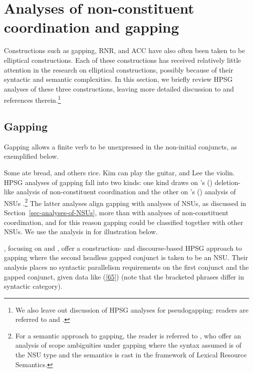 \section{Analyses of non-constituent coordination and gapping}
\label{sec-analyses-of-noncon}

Constructions such as gapping, RNR, and ACC have also often been taken to be elliptical
constructions. Each of these constructions has received relatively little attention in the research
on elliptical constructions, possibly because of their syntactic and semantic complexities. In this
section, we briefly review HPSG analyses of these three constructions, leaving more detailed
discussion to  and references therein.\footnote{We also leave out
  discussion of HPSG analyses for pseudogapping: readers are referred to \citet{Miller92d-u,
    Kim2020} and .}


\subsection{Gapping}
\label{ellipsis:sec-gapping}

Gapping %
allows a finite
verb to be unexpressed in the non-initial conjuncts, as exemplified below. %

\eal
\label{ex-gapping}
\ex Some ate bread, and others rice.\label{g1}
\ex Kim can play the guitar, and Lee the violin.\label{g2}
\zl
%
%
%
%
HPSG analyses of gapping fall into two kinds: one kind draws on \citeauthor{Beavers2004}'s (\citeyear{Beavers2004}) deletion-like analysis of non-constituent coordination \citep{Chaves2009} and the other on \citeauthor{Ginzburg:Sag:2000}'s (\citeyear{Ginzburg:Sag:2000}) analysis of NSUs \citep{Abeille2014}.\footnote{For a semantic approach to gapping, the reader is referred to \citet{Parketal2019}, who offer an analysis of scope ambiguities under gapping where the syntax assumed is of the NSU  type and the semantics is cast in the framework of Lexical Resource Semantics.} The latter analyses align gapping with analyses of NSUs, as discussed in Section~\ref{sec-analyses-of-NSUs}, more than with analyses of non-constituent coordination, and for this reason gapping could be classified together with other NSUs. We use the analysis in \citet{Abeille2014} for illustration below.


\citet{Abeille2014}, focusing on  and , offer a construction- and
discourse-based HPSG approach to gapping where the second headless gapped conjunct is taken to be an
NSU.  %
Their analysis places no syntactic parallelism requirements on the
first conjunct and the gapped conjunct, given  data like (\ref{65}) (note that the bracketed phrases differ in syntactic category).

